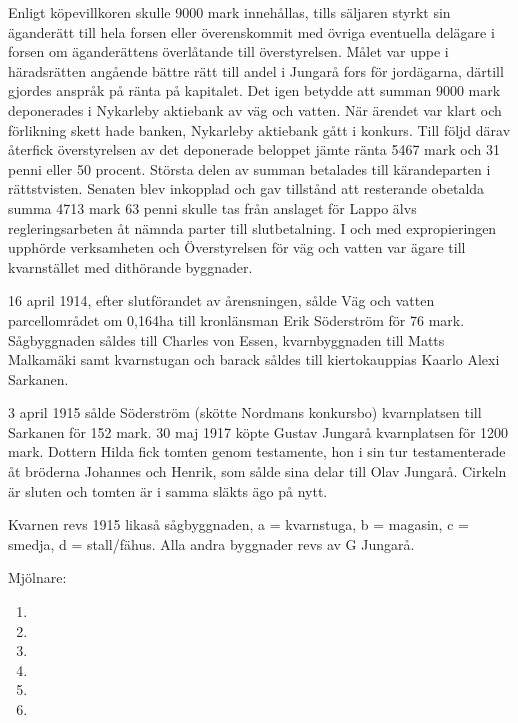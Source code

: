 Enligt köpevillkoren skulle 9000 mark innehållas, tills säljaren styrkt sin äganderätt till hela forsen eller överenskommit med övriga eventuella delägare i forsen om äganderättens överlåtande till överstyrelsen. Målet var uppe i häradsrätten angående bättre rätt till andel i Jungarå fors för jordägarna, därtill gjordes anspråk på ränta på kapitalet. Det igen betydde att summan 9000 mark deponerades i Nykarleby aktiebank av väg och vatten. När ärendet var klart och förlikning skett hade banken, Nykarleby aktiebank gått i konkurs. Till följd därav återfick överstyrelsen av det deponerade beloppet jämte ränta 5467 mark och 31 penni eller 50 procent. Största delen av summan betalades till kärandeparten i rättstvisten. Senaten blev inkopplad och gav tillstånd att resterande obetalda summa 4713 mark 63 penni skulle tas från anslaget för Lappo älvs regleringsarbeten åt nämnda parter till slutbetalning. I och med expropieringen upphörde verksamheten och Överstyrelsen för väg och vatten var ägare till kvarnstället med dithörande byggnader.

16 april 1914, efter slutförandet av årensningen, sålde Väg och vatten parcellområdet om 0,164ha till kronlänsman Erik Söderström för 76 mark. Sågbyggnaden såldes till Charles von Essen, kvarnbyggnaden till Matts Malkamäki samt kvarnstugan och barack såldes till kiertokauppias Kaarlo Alexi Sarkanen.

3 april 1915 sålde Söderström (skötte Nordmans konkursbo) kvarnplatsen till Sarkanen för 152 mark. 30 maj 1917 köpte Gustav Jungarå kvarnplatsen för 1200 mark. Dottern Hilda fick tomten genom testamente, hon i sin tur testamenterade åt bröderna Johannes och Henrik, som sålde sina delar till Olav Jungarå. Cirkeln är sluten och tomten är i samma släkts ägo på nytt.

Kvarnen revs 1915 likaså sågbyggnaden, a = kvarnstuga, b = magasin, c = smedja, d = stall/fähus. Alla andra byggnader revs av G Jungarå.

Mjölnare:
\begin{enumerate}
  \item {}
  \item {}
  \item {}
  \item {}
  \item {}
  \item {}
\end{enumerate}



